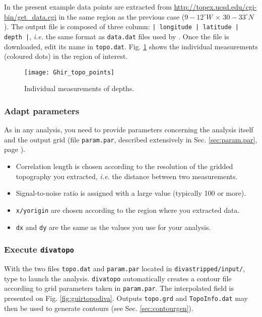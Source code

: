 In the present example data points are extracted from \url{http://topex.ucsd.edu/cgi-bin/get_data.cgi} in the same region as the previous case ($9-12^{\circ}W\, \times\, 30-33^{\circ}N$). The output file is composed of three column: \texttt{| longitude | latitude | depth |}, \textit{i.e.} the same format as \texttt{data.dat} files used by \diva. Once the file is downloaded, edit its name in \texttt{topo.dat}. Fig. \ref{fig:guirtopo} shows the individual measurements (coloured dots) in the region of interest. 


\begin{figure}[htpb]
\centering
\texttt{[image: Ghir\_topo\_points]}
\caption{Individual measurements of depths.\label{fig:guirtopo}}
\end{figure}


\subsubsection{Adapt parameters}

As in any \diva\divaspace analysis, you need to provide parameters concerning the analysis itself and the output grid (file \texttt{param.par}, described extensively in Sec. \ref{sec:param.par}, page \pageref{sec:param.par}). 

\begin{itemize}
\item Correlation length is chosen according to the resolution of the gridded topography you extracted, \textit{i.e.} the distance between two measurements.
\item Signal-to-noise ratio is assigned with a large value (typically 100 or more).
\item \texttt{x/yorigin} are chosen according to the region where you extracted data.
\item \texttt{dx} and \texttt{dy} are the same as the values you use for your analysis. 
\end{itemize}



\subsubsection{Execute \texttt{divatopo}}

With the two files \texttt{topo.dat} and \texttt{param.par} located in \texttt{divastripped/input/}, type  to launch the analysis. \texttt{divatopo} automatically creates a contour file according to grid parameters taken in \texttt{param.par}. The interpolated field is presented on Fig. \ref{fig:guirtopodiva}. Outputs \texttt{topo.grd} and \texttt{TopoInfo.dat} may then be used to generate contours (see Sec. \ref{sec:contourgen}). 



